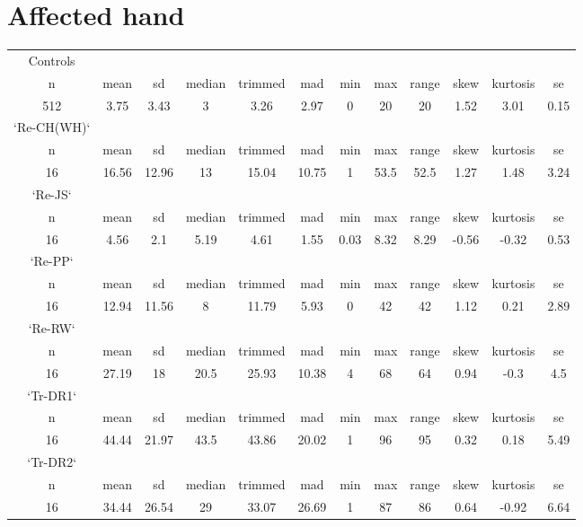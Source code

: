 \documentclass{article}
\begin{document}




\section{Affected hand}

\begin{tabular}{c c c c c c c c c c c c }
Controls&&&&&&&&&&& \\
    n &mean   &sd& median &trimmed & mad &min &max &range &skew &kurtosis &  se\\
     512 &3.75 &3.43  &    3  &  3.26 &2.97 &  0  &20 &   20 &1.52 &    3.01 &0.15\\

`Re-CH(WH)` &&&&&&&&&&&\\
   n &mean   &sd& median &trimmed & mad &min &max &range &skew &kurtosis &  se\\
    16 &16.56 &12.96 &   13 &  15.04& 10.75 &  1 &53.5&  52.5 &1.27&     1.48& 3.24\\

`Re-JS`&&&&&&&&&&&\\
   n &mean   &sd& median &trimmed & mad &min &max &range &skew &kurtosis &  se\\
     16 &4.56& 2.1 &  5.19 &   4.61 &1.55 &0.03 &8.32 & 8.29& -0.56  &  -0.32& 0.53\\

`Re-PP`&&&&&&&&&&&\\
   n &mean   &sd& median &trimmed & mad &min &max &range &skew &kurtosis &  se\\
     16 &12.94 &11.56 &     8 &  11.79& 5.93  & 0  &42   & 42& 1.12   &  0.21 &2.89\\

`Re-RW`&&&&&&&&&&&\\
  n &mean   &sd& median &trimmed & mad &min &max &range &skew &kurtosis &  se\\
     16& 27.19& 18  & 20.5 &  25.93 &10.38 &  4  &68   & 64& 0.94 &    -0.3 &4.5\\

`Tr-DR1`&&&&&&&&&&&\\
  n &mean   &sd& median &trimmed & mad &min &max &range &skew &kurtosis &  se\\
     16 &44.44 &21.97 &  43.5 &  43.86& 20.02  & 1 & 96  &  95 &0.32  &   0.18& 5.49\\

`Tr-DR2`&&&&&&&&&&&\\
  n &mean   &sd& median &trimmed & mad &min &max &range &skew &kurtosis &  se\\
     16 &34.44& 26.54 &    29 &  33.07& 26.69 &  1  &87 &   86& 0.64&   -0.92& 6.64\\


\end{tabular}
\end{document}
